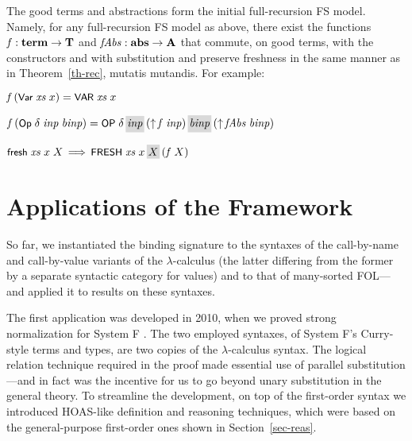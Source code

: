 \begin{thm}\label{th-rec-full} \rm
The good terms and abstractions form the initial full-recursion FS model. Namely, 
for any full-recursion FS model as above, there exist the functions $\mbox{\textit{f}}:\mbox{\bf term} \rightarrow \bf T$ 
and $\mbox{\textit{fAbs}} : \mbox{\bf abs} \rightarrow \bf A$ that commute, on good terms, 
with the constructors and with substitution and preserve freshness in the same 
manner as in Theorem~\ref{th-rec}, mutatis mutandis. For example: 
\begin{myitem}
\item $\mbox{\textit{f}}\,(\mbox{\rm\textsf{\small Var}}\;\mbox{\textit{xs}}\;x) = \mbox{{\rm \textsf{\small V$\hspace*{-0.1ex}$A$\hspace*{-0.1ex}$R}}}\;\mbox{\textit{xs}}\;x$
\item $\f\,(\Op\;\delta\;\inp\;\binp) = 
\OP\;\delta\,\coll{\inp}\,(\lift\,\f\;\inp)\,\coll{\binp}\,(\lift\,\fAbs\;\binp)$
\item $\fresh\;\xs\;x\;X \,\Lra\, \FRESH\;\xs\;x\,\coll{X}\,(\f\;X)$
\end{myitem}
\end{thm}

 

\section{Applications of the Framework} \label{sec-app}  


So far, we instantiated the binding signature to 
the syntaxes of the call-by-name and call-by-value
variants of the $\lambda$-calculus 
(the latter differing from the former by a separate syntactic category for values) 
and to that of many-sorted FOL---and applied it to results on these syntaxes. 
%

The first application was developed in 2010, when we proved strong normalization 
for System F \cite{pop-HOASOnFOAS}. The two employed syntaxes, of System F's Curry-style terms and types, are two copies 
of the $\lambda$-calculus syntax. 
The logical relation technique required in the proof made essential use of 
parallel substitution---and in fact was the incentive for us to go beyond unary 
substitution in the general theory. 
To streamline the development, on top of the first-order syntax we introduced 
HOAS-like definition and reasoning techniques, which were %
based on the general-purpose first-order ones shown in Section~\ref{sec-reas}. 

